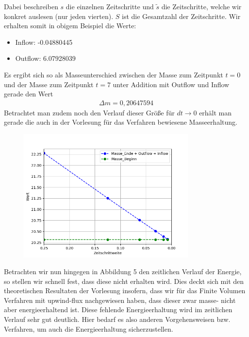Dabei beschreiben $s$ die einzelnen Zeitschritte und $\tilde{s}$ die Zeitschritte, welche wir konkret auslesen (nur jeden vierten). $S$ ist die Gesamtzahl der Zeitschritte.
Wir erhalten somit in obigem Beispiel die Werte:
\begin{itemize}
	\item Inflow: -0.04880445
	\item Outflow: 6.07928039
\end{itemize}
Es ergibt sich so als Masseunterschied zwischen der Masse zum Zeitpunkt $t=0$ und der Masse zum Zeitpunkt $t=7$ unter Addition mit Outflow und Inflow gerade den Wert
\begin{align*}
	\Delta m = 0,20647594
\end{align*} 
Betrachtet man zudem noch den Verlauf dieser Größe für $dt \to 0$ erhält man gerade die auch in der Vorlesung für das Verfahren bewiesene Masseerhaltung.
\begin{figure}[H]
	\centering
	\includegraphics[width=0.8\textwidth]{../Aufgabe21/massoverdt2.png}
\end{figure}


Betrachten wir nun hingegen in Abbildung 5 den zeitlichen Verlauf der Energie, so stellen wir schnell fest, dass diese nicht erhalten wird. Dies deckt sich mit den theoretischen Resultaten der Vorlesung insofern, dass wir für das Finite Volumen Verfahren mit upwind-flux nachgewiesen haben, dass dieser zwar masse- nicht aber energieerhaltend ist. Diese fehlende Energieerhaltung wird im zeitlichen Verlauf sehr gut deutlich. Hier bedarf es also anderen Vorgehensweisen bzw. Verfahren, um auch die Energieerhaltung sicherzustellen.
\newpage
